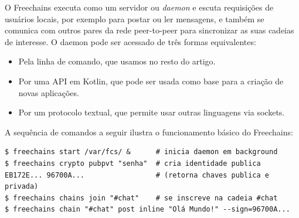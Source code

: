 \documentclass[12pt]{article}
\newcommand{\FC} {Freechains\xspace}
\begin{document}
O \FC executa como um servidor ou \emph{daemon} e escuta requisições de
usuários locais, por exemplo para postar ou ler mensagens, e também se comunica
com outros pares da rede peer-to-peer para sincronizar as suas cadeias de
interesse.
O daemon pode ser acessado de três formas equivalentes:
%
\begin{itemize}
\item Pela linha de comando, que usamos no resto do artigo.
\item Por uma API em Kotlin, que pode ser usada como base para a criação de
      novas aplicações.
\item Por um protocolo textual, que permite usar outras linguagens via sockets.
\end{itemize}
%

%
A sequência de comandos a seguir ilustra o funcionamento básico do \FC:
%
{\footnotesize
\begin{verbatim}
$ freechains start /var/fcs/ &      # inicia daemon em background
$ freechains crypto pubpvt "senha"  # cria identidade publica
EB172E... 96700A...                 # (retorna chaves publica e privada)
$ freechains chains join "#chat"    # se inscreve na cadeia #chat
$ freechains chain "#chat" post inline "Olá Mundo!" --sign=96700A...
\end{verbatim}
}
\end{document}
